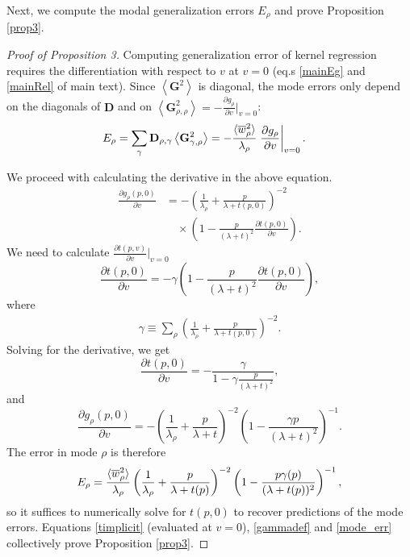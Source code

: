 \documentclass{article}
\begin{document}
Next, we compute the modal generalization errors $E_{\rho}$ and prove Proposition \ref{prop3}.

\begin{proof}[Proof of Proposition 3]Computing generalization error of kernel regression requires the differentiation with respect to $v$ at $v=0$ (eq.s \eqref{mainEg} and \eqref{mainRel} of main text). Since $\left< \mathbf{G}^2 \right>$ is diagonal, the mode errors only depend on the diagonals of $\mathbf{D}$ and on $\left< \mathbf{G}_{\rho,\rho}^2 \right> = -\frac{\partial g_\rho }{\partial v}|_{v=0}$: 
%
\begin{align}
    E_\rho &= \sum_{\gamma} \mathbf{D}_{\rho,\gamma} \left< \mathbf{G}^2_{\gamma,\rho} \right> =  - \frac{\braket{\overline{w}_\rho^2}}{\lambda_\rho}\left. \frac{\partial g_\rho}{\partial v}\right|_{v=0}.
\end{align}

We proceed with calculating the derivative in the above equation.
%
\begin{align}
    \frac{\partial g_\rho(p,0) }{\partial v} &= -\left(\frac{1}{\lambda_\rho} + \frac{p}{\lambda + t(p,0)} \right)^{-2}  \nonumber \\
    &\quad\times \left( 1 - \frac{p}{(\lambda + t)^2} \frac{\partial t(p,0)}{\partial v} \right).
\end{align}
We need to calculate $\frac{\partial t(p,v)}{\partial v}|_{v=0}$
\begin{equation}
    \frac{\partial t(p,0)}{\partial v} = - %
    \gamma \left( 1 - \frac{p}{(\lambda + t)^2} \frac{\partial t(p,0)}{\partial v} \right),
\end{equation}
where 
\begin{align}\label{gammadef}
\gamma \equiv  \sum_\rho \left(\frac{1}{\lambda_\rho} + \frac{p}{\lambda + t(p,0)} \right)^{-2}.
\end{align}
%
Solving for the derivative, we get
\begin{equation}
    \frac{\partial t(p,0)}{\partial v} = - \frac{\gamma}{1 - \gamma \frac{p}{(\lambda+t)^2}}, %
\end{equation}
%
and
\begin{equation}
    \frac{\partial g_\rho(p,0) }{\partial v} = -\left(\frac{1}{\lambda_\rho} + \frac{p}{\lambda + t} \right)^{-2} \left(1 - \frac{\gamma p}{(\lambda+t)^2} \right)^{-1}.
\end{equation}
%
The error in mode $\rho$ is therefore
\begin{align}\label{mode_err}
    E_\rho =  \frac{\braket{\overline{w}_\rho^2}}{\lambda_\rho}\left(\frac{1}{\lambda_\rho} + \frac{p}{\lambda+t(p)}\right)^{-2} \left(1 - \frac{p \gamma(p)}{(\lambda + t(p))^2}\right)^{-1},
\end{align}
%
so it suffices to numerically solve for $t(p,0)$ to recover predictions of the mode errors. Equations \eqref{timplicit} (evaluated at $v=0$), \eqref{gammadef} and \eqref{mode_err} collectively prove Proposition \ref{prop3}.
\end{proof}
\end{document}
